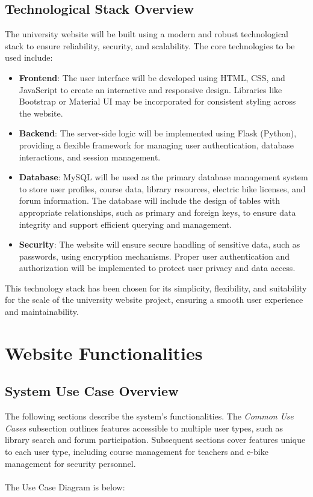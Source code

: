 \documentclass[12pt]{article}
\begin{document}
\subsection{Technological Stack Overview}
The university website will be built using a modern and robust technological stack to ensure reliability, security, and scalability. 
The core technologies to be used include:
\begin{itemize}
    \item \textbf{Frontend}: The user interface will be developed using HTML, CSS, and JavaScript to create an interactive and
     responsive design. Libraries like Bootstrap or Material UI may be incorporated for consistent styling across the website.
    \item \textbf{Backend}: The server-side logic will be implemented using Flask (Python), providing a flexible framework for 
    managing user authentication, database interactions, and session management.
    \item \textbf{Database}: MySQL will be used as the primary database management system to store user profiles, 
    course data, library resources, electric bike licenses, and forum information. The database will include the design of 
    tables with appropriate relationships, such as primary and foreign keys, to ensure data integrity and support efficient 
    querying and management.
    \item \textbf{Security}: The website will ensure secure handling of sensitive data, such as passwords, using encryption 
    mechanisms. Proper user authentication and authorization will be implemented to protect user privacy and data access.
\end{itemize}
This technology stack has been chosen for its simplicity, flexibility, and suitability for the scale of the university website project, 
ensuring a smooth user experience and maintainability.

\newpage
\section{Website Functionalities}
\subsection{System Use Case Overview}

The following sections describe the system's functionalities. The \textit{Common Use Cases} subsection outlines features accessible to multiple user types, such as library search and forum participation. Subsequent sections cover features unique to each user type, including course management for teachers and e-bike management for security personnel.\\ \\ 
The Use Case Diagram is below:
\end{document}
